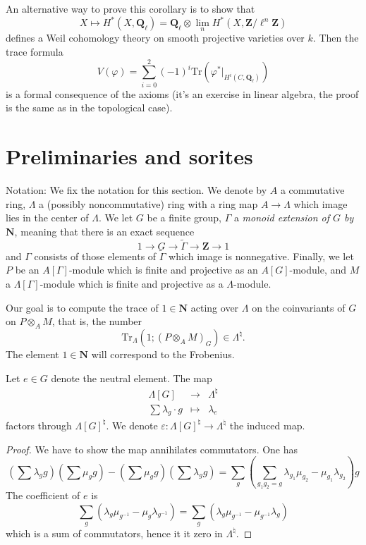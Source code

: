 \noindent
An alternative way to prove this corollary is to show that
$$
X \mapsto H^* (X, \mathbf{Q}_\ell) =
\mathbf{Q}_\ell \otimes
\lim_n H^*(X, \mathbf{Z}/\ell^n\mathbf{Z})
$$
defines a Weil cohomology theory on smooth projective varieties over $k$. Then
the trace formula
$$
V(\varphi) = \sum_{i=0}^2 (-1)^i \text{Tr}(\varphi^* |_{H^i
(C, \mathbf{Q}_\ell)})
$$
is a formal consequence of the axioms (it's an exercise in linear algebra, the
proof is the same as in the topological case).




\section{Preliminaries and sorites}
\label{section-preliminaries}

\noindent
Notation:
We fix the notation for this section. We denote by $A$ a commutative ring,
$\Lambda$ a (possibly noncommutative) ring with a ring map $A\to \Lambda$ which
image lies in the center of $\Lambda$. We let $G$ be a finite group, $\Gamma$ a
{\it monoid extension of $G$ by $\mathbf{N}$}, meaning that there is an exact
sequence
$$
1\to G\to \tilde\Gamma\to \mathbf{Z}\to 1
$$
and $\Gamma$ consists of those elements of $\tilde\Gamma$ which image is
nonnegative. Finally, we let $P$ be an $A[\Gamma]$-module which is finite and
projective as an $A[G]$-module, and $M$ a $\Lambda[\Gamma]$-module which is
finite and projective as a $\Lambda$-module.

\medskip\noindent
Our goal is to compute the trace of $1 \in \mathbf{N}$ acting over $\Lambda$
on the coinvariants of $G$ on $P \otimes_A M$, that is, the number
$$
\text{Tr}_{\Lambda}\left(1; \left(P \otimes_A M\right)_G\right) \in
\Lambda^\natural.
$$
The element $1\in \mathbf{N}$ will correspond to the Frobenius.

\begin{lemma}
\label{lemma-epsilon}
Let $e\in G$ denote the neutral element. The map
$$
\begin{matrix}
\Lambda[G] & \longrightarrow & \Lambda^{\natural}\\
\sum \lambda_g\cdot g & \longmapsto& \lambda_e
\end{matrix}
$$
factors through $\Lambda[G]^\natural$. We denote $\varepsilon:
\Lambda[G]^\natural\to \Lambda^\natural$ the induced map.
\end{lemma}

\begin{proof}
We have to show the map annihilates commutators. One has
$$
\left(\sum\lambda_g g\right)\left(\sum\mu_g g\right)-\left(\sum \mu_g
g\right)\left(\sum\lambda_g g\right)
= \sum_g\left(\sum_{g_1g_2=g}
\lambda_{g_1}\mu_{g_2}-\mu_{g_1}\lambda_{g_2}\right)g
$$
The coefficient of $e$ is
$$
\sum_g\left(\lambda_g\mu_{g^{-1}}-\mu_g\lambda_{g^{-1}}\right) =
\sum_g\left(\lambda_g\mu_{g^{-1}}-\mu_{g^{-1}}\lambda_g\right)
$$
which is a sum of commutators, hence it it zero in $\Lambda^\natural$.
\end{proof}

